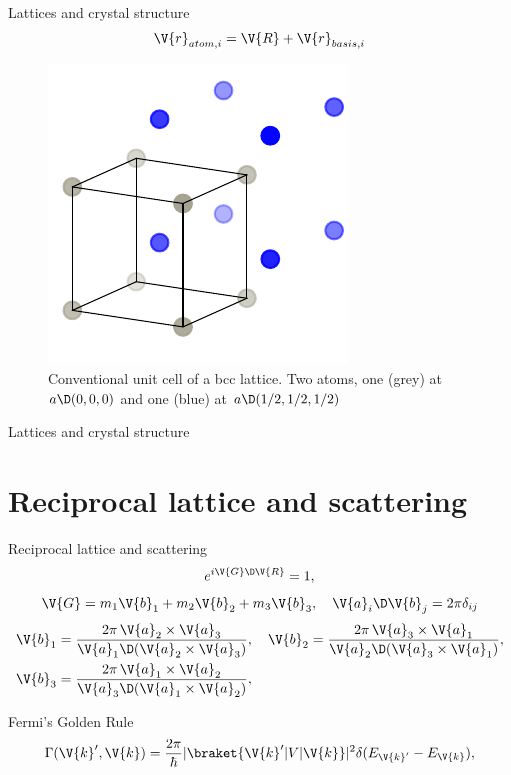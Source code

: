 \documentclass{beamer}
\begin{document}
\begin{frame}{Lattices and crystal structure}
\begin{equation*}\label{key}
	\V{r}_{atom,i} = \V{R} + \V{r}_{basis, i}
\end{equation*}
\begin{figure}[H]
	\centering
	\includegraphics{figures/lattice_unfinished_1.pdf}
	\caption{Conventional unit cell of a bcc lattice. Two atoms, one (grey) at $ a \D (0,0,0) $ and one (blue) at $ a\D(1/2, 1/2, 1/2) $}
\end{figure}
\end{frame}


\begin{frame}{Lattices and crystal structure}
\end{frame}



\section{Reciprocal lattice and scattering}
\begin{frame}{Reciprocal lattice and scattering}
\begin{equation*}
	e^{i \V{G} \D\V{R}} = 1,
\end{equation*}
\begin{equation*}\label{key}
	\V{G} = m_1 \V{b}_1 + m_2 \V{b}_2 + m_3\V{b}_3, \quad \V{a}_i \D \V{b}_j = 2\pi \delta_{ij}
\end{equation*}
\begin{align*}\label{key}
	\V{b}_1 &= \frac{2\pi \, \V{a}_2 \times \V{a}_3}{\V{a}_1 \D (\V{a}_2 \times \V{a}_3)}, \quad \V{b}_2 = \frac{2\pi \, \V{a}_3 \times \V{a}_1}{\V{a}_2 \D (\V{a}_3 \times \V{a}_1)}, \\
	\V{b}_3 &= \frac{2\pi \, \V{a}_1 \times \V{a}_2}{\V{a}_3 \D (\V{a}_1 \times \V{a}_2)},
\end{align*}
\end{frame}


\begin{frame}
Fermi's Golden Rule
\begin{equation}\label{key}
	\Gamma(\V{k}', \V{k}) = \frac{2\pi}{\hbar}|\braket{\V{k}' | V | \V{k}}|^2 \delta(E_{\V{k}'}-E_{\V{k}}),
\end{equation}
\end{frame}
\end{document}
